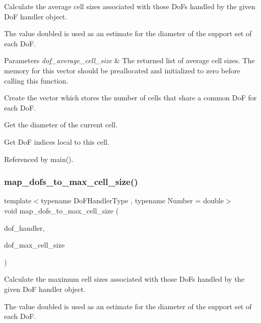 Calculate the average cell sizes associated with those Do\+Fs handled by the given DoF handler object.

The value doubled is used as an estimate for the diameter of the support set of each DoF.


\begin{DoxyParams}{Parameters}
{\em dof\+\_\+average\+\_\+cell\+\_\+size} & The returned list of average cell sizes. The memory for this vector should be preallocated and initialized to zero before calling this function. \\
\hline
\end{DoxyParams}
Create the vector which stores the number of cells that share a common DoF for each DoF.

Get the diameter of the current cell.

Get DoF indices local to this cell.

Referenced by main().

\mbox{\label{group__hierarchical__matrices_ga1eee708f9eb5b9e9a2d8031c60c5d315}} 
\subsubsection{\texorpdfstring{map\+\_\+dofs\+\_\+to\+\_\+max\+\_\+cell\+\_\+size()}{map\_dofs\_to\_max\_cell\_size()}}
{\footnotesize\ttfamily template$<$typename Do\+F\+Handler\+Type , typename Number  = double$>$ \\
void map\+\_\+dofs\+\_\+to\+\_\+max\+\_\+cell\+\_\+size (\begin{DoxyParamCaption}\item[{const Do\+F\+Handler\+Type \&}]{dof\+\_\+handler,  }\item[{std\+::vector$<$ Number $>$ \&}]{dof\+\_\+max\+\_\+cell\+\_\+size }\end{DoxyParamCaption})}

Calculate the maximum cell sizes associated with those Do\+Fs handled by the given DoF handler object.

The value doubled is used as an estimate for the diameter of the support set of each DoF.


